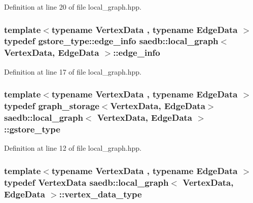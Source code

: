 Definition at line 20 of file local\-\_\-graph.\-hpp.

\hypertarget{classsaedb_1_1local__graph_a7aa24181f4937dcdc434987de7e92e44}{
\subsubsection[{edge\-\_\-info}]{\setlength{\rightskip}{0pt plus 5cm}template$<$typename Vertex\-Data , typename Edge\-Data $>$ typedef {\bf gstore\-\_\-type\-::edge\-\_\-info} {\bf saedb\-::local\-\_\-graph}$<$ Vertex\-Data, Edge\-Data $>$\-::{\bf edge\-\_\-info}}}\label{d9/d4a/classsaedb_1_1local__graph_a7aa24181f4937dcdc434987de7e92e44}


Definition at line 17 of file local\-\_\-graph.\-hpp.

\hypertarget{classsaedb_1_1local__graph_ab143bc0748941696c01a5569bcd79151}{
\subsubsection[{gstore\-\_\-type}]{\setlength{\rightskip}{0pt plus 5cm}template$<$typename Vertex\-Data , typename Edge\-Data $>$ typedef {\bf graph\-\_\-storage}$<$Vertex\-Data, Edge\-Data$>$ {\bf saedb\-::local\-\_\-graph}$<$ Vertex\-Data, Edge\-Data $>$\-::{\bf gstore\-\_\-type}}}\label{d9/d4a/classsaedb_1_1local__graph_ab143bc0748941696c01a5569bcd79151}


Definition at line 12 of file local\-\_\-graph.\-hpp.

\hypertarget{classsaedb_1_1local__graph_a844bd7c9e27012270a4d6499ff830360}{
\subsubsection[{vertex\-\_\-data\-\_\-type}]{\setlength{\rightskip}{0pt plus 5cm}template$<$typename Vertex\-Data , typename Edge\-Data $>$ typedef Vertex\-Data {\bf saedb\-::local\-\_\-graph}$<$ Vertex\-Data, Edge\-Data $>$\-::{\bf vertex\-\_\-data\-\_\-type}}}\label{d9/d4a/classsaedb_1_1local__graph_a844bd7c9e27012270a4d6499ff830360}


